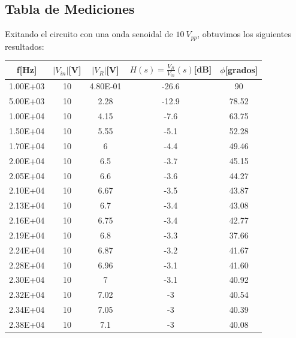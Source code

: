 \subsection{Tabla de Mediciones}

Exitando el circuito con una onda senoidal de $10~V_{pp}$, obtuvimos los siguientes resultados:

\begin{table}[!htb]
\centering
\begin{tabular}{|c|c|c|c|c|}
\hline
f{[}Hz{]}    & $|V_{in}|${[}V{]} & $|V_R|${[}V{]}      & $H(s)=\frac{V_R}{V_{in}} (s)${[}dB{]} & $\phi${[}grados{]} \\ \hline
1.00E+03  & 10    & 4.80E-01 & -26.6           & 90                  \\ \hline
5.00E+03  & 10    & 2.28     & -12.9           & 78.52         \\ \hline
1.00E+04  & 10    & 4.15     & -7.6            & 63.75         \\ \hline
1.50E+04  & 10    & 5.55     & -5.1            & 52.28        \\ \hline
1.70E+04  & 10    & 6        & -4.4            & 49.46         \\ \hline
2.00E+04  & 10    & 6.5      & -3.7            & 45.15        \\ \hline
2.05E+04  & 10    & 6.6      & -3.6            & 44.27         \\ \hline
2.10E+04  & 10    & 6.67     & -3.5            & 43.87        \\ \hline
2.13E+04  & 10    & 6.7      & -3.4            & 43.08         \\ \hline
2.16E+04  & 10    & 6.75     & -3.4            & 42.77         \\ \hline
2.19E+04  & 10    & 6.8      & -3.3            & 37.66        \\ \hline
2.24E+04  & 10    & 6.87     & -3.2            & 41.67       \\ \hline
2.28E+04  & 10    & 6.96     & -3.1            & 41.60        \\ \hline
2.30E+04  & 10    & 7        & -3.1            & 40.92        \\ \hline
2.32E+04  & 10    & 7.02     & -3              & 40.54         \\ \hline
2.34E+04  & 10    & 7.05     & -3              & 40.39        \\ \hline
2.38E+04  & 10    & 7.1      & -3              & 40.08         \\ \hline

\end{tabular}
\end{table}
